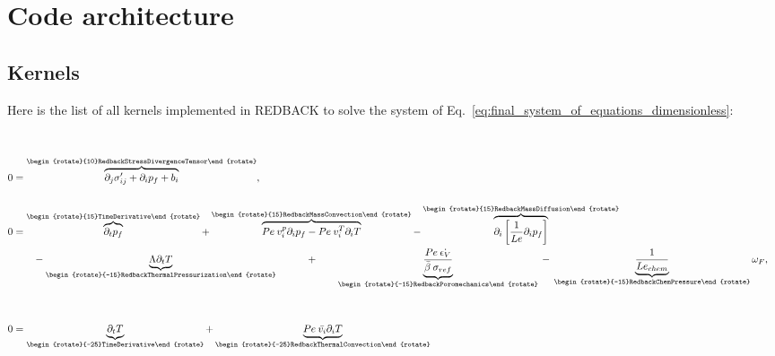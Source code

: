 \documentclass[]{scrreprt}
\newcommand{\redback}{{REDBACK}}
\newcommand{\pd}{\ensuremath{\partial}}
\newcommand{\pdiff}[2]{\ensuremath{\pd_{#2} #1}}
\begin{document}
\chapter{Code architecture}
\label{chapter:code}
\section{Kernels}
Here is the list of all kernels implemented in \redback{} to solve the system of Eq.~\ref{eq:final_system_of_equations_dimensionless}:
\begin{align*}
  \\ \\ 
  0 &= \overbrace{ \pdiff{\sigma^{\prime}_{ij}}{j} + \pdiff{p_f}{i} + b_i }^{\begin{rotate}{10}RedbackStressDivergenceTensor\end{rotate}} , \\ 
  \\   
  0 &= \overbrace{ \pdiff{p_f}{t} }^{\begin{rotate}{15}TimeDerivative\end{rotate}} 
       + \overbrace{ Pe\: v^p_i \pdiff{p_f}{i}
       - Pe\:v^T_i \pdiff{T}{i} }^{\begin{rotate}{15}RedbackMassConvection\end{rotate}} 
       - \overbrace{ \pdiff{\left[\frac{1}{Le} \pdiff{p_f}{i} \right]}{i} }^{\begin{rotate}{15}RedbackMassDiffusion\end{rotate}} 
       \\ \nonumber
  ~ & \qquad 
  - \underbrace{ \Lambda \pdiff{T}{t} }_{\begin{rotate}{-15}RedbackThermalPressurization\end{rotate}} 
  \qquad\quad+ \qquad \underbrace{ \frac{Pe\:\dot{\epsilon_V}}{\bar{\beta}\:\sigma_{ref}}  }_{\begin{rotate}{-15}RedbackPoromechanics\end{rotate}} 
  \: - \: \underbrace{ \frac{1}{Le_{chem}}  }_{\begin{rotate}{-15}RedbackChemPressure\end{rotate}} 
  \omega_F, \\ \\ \\
  0 &= \underbrace{ \pdiff{T}{t}   }_{\begin{rotate}{-25}TimeDerivative\end{rotate}} 
  +  \underbrace{ Pe\:\bar{v_i}\pdiff{T}{i}   }_{\begin{rotate}{-25}RedbackThermalConvection\end{rotate}} 

\end{align*}
\end{document}
